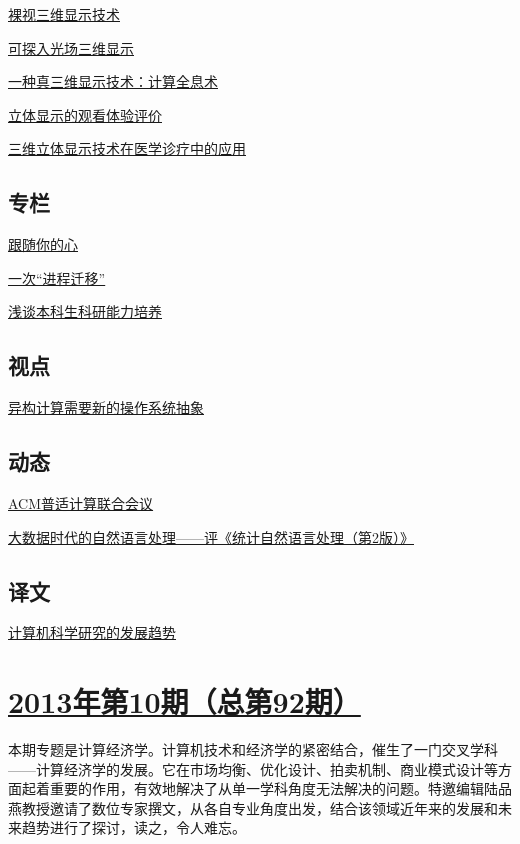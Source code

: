 \documentclass[a4paper]{article}
\begin{document}
\href{http://history.ccf.org.cn/resources/1190201776262/2013/11/15/1.pdf}{裸视三维显示技术}

\href{http://history.ccf.org.cn/resources/1190201776262/2013/11/15/2.pdf}{可探入光场三维显示}

\href{http://history.ccf.org.cn/resources/1190201776262/2013/11/15/3.pdf}{一种真三维显示技术：计算全息术}

\href{http://history.ccf.org.cn/resources/1190201776262/2013/11/15/4.pdf}{立体显示的观看体验评价}

\href{http://history.ccf.org.cn/resources/1190201776262/2013/11/15/5.pdf}{三维立体显示技术在医学诊疗中的应用}

\subsection{专栏}
\href{http://history.ccf.org.cn/resources/1190201776262/2013/11/15/7.pdf}{跟随你的心}

\href{http://history.ccf.org.cn/resources/1190201776262/2013/11/15/8.pdf}{一次“进程迁移”}

\href{http://history.ccf.org.cn/resources/1190201776262/2013/11/15/6.pdf}{浅谈本科生科研能力培养}

\subsection{视点}
\href{http://history.ccf.org.cn/resources/1190201776262/2013/11/15/9.pdf}{异构计算需要新的操作系统抽象}

\subsection{动态}
\href{http://history.ccf.org.cn/resources/1190201776262/2013/11/15/10.pdf}{ACM普适计算联合会议}

\href{http://history.ccf.org.cn/resources/1190201776262/2013/11/15/11.pdf}{大数据时代的自然语言处理——评《统计自然语言处理（第2版）》}

\subsection{译文}
\href{http://history.ccf.org.cn/resources/1190201776262/2013/11/15/12.pdf}{计算机科学研究的发展趋势}


\section{\href{http://history.ccf.org.cn/sites/ccf/jsjtbbd.jsp?contentId=2763391724116}{\textbf{2013年第10期（总第92期）}}}
本期专题是计算经济学。计算机技术和经济学的紧密结合，催生了一门交叉学科——计算经济学的发展。它在市场均衡、优化设计、拍卖机制、商业模式设计等方面起着重要的作用，有效地解决了从单一学科角度无法解决的问题。特邀编辑陆品燕教授邀请了数位专家撰文，从各自专业角度出发，结合该领域近年来的发展和未来趋势进行了探讨，读之，令人难忘。
\end{document}
